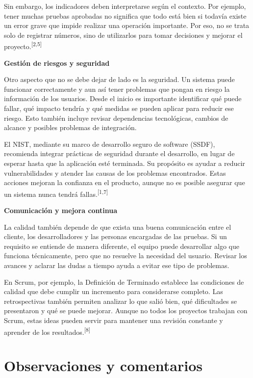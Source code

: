 \documentclass[12pt]{article}
\begin{document}
Sin embargo, los indicadores deben interpretarse según el contexto. Por
ejemplo, tener muchas pruebas aprobadas no significa que todo está bien si
todavía existe un error grave que impide realizar una operación importante.
Por eso, no se trata solo de registrar números, sino de utilizarlos para
tomar decisiones y mejorar el proyecto.\textsuperscript{[2,5]}

\noindent\textbf{Gestión de riesgos y seguridad}

Otro aspecto que no se debe dejar de lado es la seguridad. Un sistema puede
funcionar correctamente y aun así tener problemas que pongan en riesgo la
información de los usuarios. Desde el inicio es importante identificar qué
puede fallar, qué impacto tendría y qué medidas se pueden aplicar para reducir
ese riesgo. Esto también incluye revisar dependencias tecnológicas, cambios
de alcance y posibles problemas de integración.

El NIST, mediante su marco de desarrollo seguro de software (SSDF), recomienda
integrar prácticas de seguridad durante el desarrollo, en lugar de esperar
hasta que la aplicación esté terminada. Su propósito es ayudar a reducir
vulnerabilidades y atender las causas de los problemas encontrados. Estas
acciones mejoran la confianza en el producto, aunque no es posible asegurar
que un sistema nunca tendrá fallas.\textsuperscript{[1,7]}

\noindent\textbf{Comunicación y mejora continua}

La calidad también depende de que exista una buena comunicación entre el
cliente, los desarrolladores y las personas encargadas de las pruebas. Si un
requisito se entiende de manera diferente, el equipo puede desarrollar algo
que funciona técnicamente, pero que no resuelve la necesidad del usuario.
Revisar los avances y aclarar las dudas a tiempo ayuda a evitar ese tipo de
problemas.

En Scrum, por ejemplo, la Definición de Terminado establece las condiciones
de calidad que debe cumplir un incremento para considerarse completo. Las
retrospectivas también permiten analizar lo que salió bien, qué dificultades
se presentaron y qué se puede mejorar. Aunque no todos los proyectos trabajan
con Scrum, estas ideas pueden servir para mantener una revisión constante y
aprender de los resultados.\textsuperscript{[8]}

\section*{Observaciones y comentarios}
\end{document}
